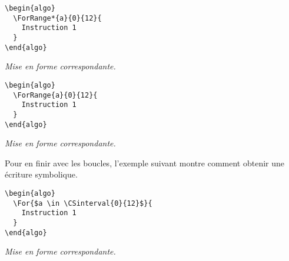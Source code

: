 \documentclass[12pt,a4paper]{article}
\theoremstyle{definition}
\newenvironment{frame-gene}[1][]{
	\begin{tcolorbox}[
		title        = #1, 
		colbacktitle = black!10!white, 
		colback      = white, 
		coltitle     = black,
		fonttitle    = \bfseries\itshape\small, 
		breakable,
		center title]
}{
	\end{tcolorbox}
}
\begin{document}
\begin{multicols}{2}
\centering
\begin{frame-gene}
\begin{verbatim}
\begin{algo}
  \ForRange*{a}{0}{12}{
    Instruction 1
  }
\end{algo}
\end{verbatim}
\end{frame-gene}
\vfill\null
\columnbreak
\textit{Mise en forme correspondante.}
\begin{algo}
\end{algo}
\vfill\null
\end{multicols}


\begin{multicols}{2}
\centering
\begin{frame-gene}
\begin{verbatim}
\begin{algo}
  \ForRange{a}{0}{12}{
    Instruction 1
  }
\end{algo}
\end{verbatim}
\end{frame-gene}
\vfill\null
\columnbreak
\textit{Mise en forme correspondante.}
\begin{algo}
\end{algo}
\vfill\null
\end{multicols}


\vspace{-1em}

Pour en finir avec les boucles, l'exemple suivant montre comment obtenir une écriture symbolique.


\begin{multicols}{2}
\centering
\begin{frame-gene}
\begin{verbatim}
\begin{algo}
  \For{$a \in \CSinterval{0}{12}$}{
    Instruction 1
  }
\end{algo}
\end{verbatim}
\end{frame-gene}
\vfill\null
\columnbreak
\textit{Mise en forme correspondante.}
\begin{algo}
\end{algo}
\vfill\null
\end{multicols}
\end{document}
